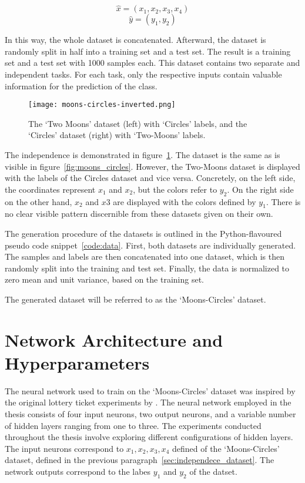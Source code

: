 \[\hat x = ( x_1 , x_2 , x_3 , x_4 )\]
\[\hat y = ( y_1 , y_2 )\]

In this way, the whole dataset is concatenated.
Afterward, the dataset is randomly split in half into a training set and a test set.
The result is a training set and a test set with 1000 samples each.
This dataset contains two separate and independent tasks.
For each task, only the respective inputs contain valuable information for the prediction of the class.

\begin{figure}[ht]
    \centering
    \texttt{[image: moons-circles-inverted.png]}
    \caption{
        The `Two Moons' dataset (left) with `Circles' labels, and the `Circles' dataset (right) with `Two-Moons' labels. 
    }\label{fig:moons_circles_inverted}
\end{figure}

The independence is demonstrated in figure~\ref{fig:moons_circles_inverted}.
The dataset is the same as is visible in figure~\ref{fig:moons_circles}. 
However, the Two-Moons dataset is displayed with the labels of the Circles dataset and vice versa.
Concretely, on the left side, the coordinates represent $x_1$ and $x_2$, but the colors refer to $y_2$.
On the right side on the other hand, $x_2$ and $x3$ are displayed with the colors defined by $y_1$.
There is no clear visible pattern discernible from these datasets given on their own.

The generation procedure of the datasets is outlined in the Python-flavoured pseudo code snippet~\ref{code:data}.
First, both datasets are individually generated.
The samples and labels are then concatenated into one dataset, which is then randomly split into the training and test set.
Finally, the data is normalized to zero mean and unit variance, based on the training set.

The generated dataset will be referred to as the `Moons-Circles' dataset.

\section{Network Architecture and Hyperparameters}
The neural network used to train on the `Moons-Circles' dataset was inspired by the original lottery ticket experiments by \textcite{LTH}. 
The neural network employed in the thesis consists of four input neurons, two output neurons, and a variable number of hidden layers ranging from one to three.
The experiments conducted throughout the thesis involve exploring different configurations of hidden layers.
The input neurons correspond to $x_1, x_2, x_3, x_4$ defined of the `Moons-Circles' dataset, defined in the previous paragraph~\ref{sec:independece_dataset}.
The network outputs correspond to the labes $y_1$ and $y_2$ of the datset.

